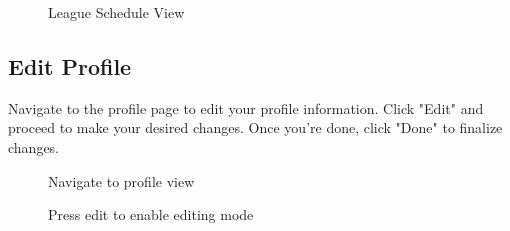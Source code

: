 \documentclass{article}
\begin{document}
\begin{figure}[H]
    \centering
    \caption{League Schedule View}
\end{figure}

\subsection{Edit Profile}
Navigate to the profile page to edit your profile information. Click "Edit" and proceed to make your desired changes. Once you're done, click "Done" to finalize changes.

\begin{figure}[H]
    \centering
    \caption{Navigate to profile view}
\end{figure}

\begin{figure}[H]
    \centering
    \caption{Press edit to enable editing mode}
\end{figure}
\end{document}
